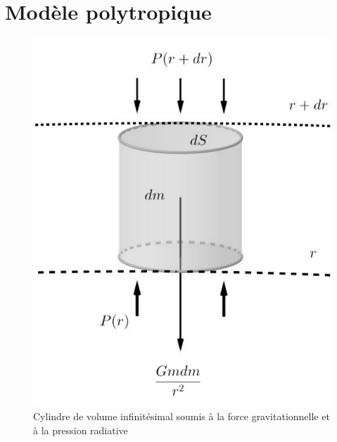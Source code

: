 


\appendix

\chapter{Modèle polytropique}\label{Annexe A}

\begin{figure}[H]
	\centering
	\includegraphics[scale=0.5]{images/cylindre}
	\caption[Cylindre de volume infinitésimal soumis à la force gravitationnelle et à la pression radiative - figure réalisée avec GeoGebra]{Cylindre de volume infinitésimal soumis à la force gravitationnelle et à la pression radiative}
	\label{Fig. A.1}
\end{figure}\bigskip


